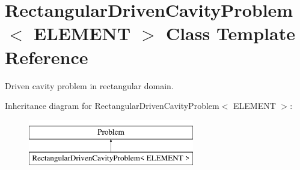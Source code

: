 \hypertarget{classRectangularDrivenCavityProblem}{}\section{Rectangular\+Driven\+Cavity\+Problem$<$ E\+L\+E\+M\+E\+NT $>$ Class Template Reference}
\label{classRectangularDrivenCavityProblem}


Driven cavity problem in rectangular domain.  


Inheritance diagram for Rectangular\+Driven\+Cavity\+Problem$<$ E\+L\+E\+M\+E\+NT $>$\+:\begin{figure}[H]
\begin{center}
\leavevmode
\includegraphics[height=2.000000cm]{classRectangularDrivenCavityProblem}
\end{center}
\end{figure}
